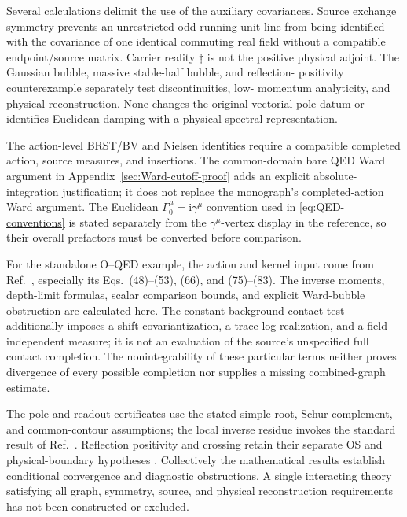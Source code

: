 \documentclass[final,5p,times,twocolumn,numbers,nopreprintline]{elsarticle}
\numberwithin{equation}{section}
\theoremstyle{definition}
\theoremstyle{remark}
\newcommand{\ii}{\mathrm i}
\begin{document}
Several calculations delimit the use of the auxiliary covariances.
Source exchange symmetry prevents an unrestricted odd running-unit
line from being identified with the covariance of one identical
commuting real field without a compatible endpoint/source matrix.
Carrier reality $\ddagger$ is not the positive physical adjoint.
The Gaussian bubble, massive stable-half bubble, and reflection-
positivity counterexample separately test discontinuities, low-
momentum analyticity, and physical reconstruction. None changes
the original vectorial pole datum or identifies Euclidean damping
with a physical spectral representation.

The action-level BRST/BV and Nielsen identities require a compatible
completed action, source measures, and insertions. The common-domain
bare QED Ward argument in Appendix~\ref{sec:Ward-cutoff-proof}
adds an explicit absolute-integration justification; it does not
replace the monograph's completed-action Ward argument.
The Euclidean $\Gamma_0^\mu=\ii\gamma^\mu$ convention used in
\eqref{eq:QED-conventions} is stated separately from the
$\gamma^\mu$-vertex display in the reference, so their overall
prefactors must be converted before comparison.

For the standalone O--QED example, the action and kernel input come
from Ref.~\cite{ChiapponeIgnition}, especially its
Eqs.~(48)--(53), (66), and (75)--(83).
The inverse moments, depth-limit formulas, scalar comparison bounds,
and explicit Ward-bubble obstruction are calculated here. The
constant-background contact test additionally imposes a shift
covariantization, a trace-log realization, and a field-independent
measure; it is not an evaluation of the source's unspecified full
contact completion. The nonintegrability of these particular
terms neither proves divergence of every possible completion nor
supplies a missing combined-graph estimate.

The pole and readout certificates use the stated simple-root,
Schur-complement, and common-contour assumptions; the local inverse
residue invokes the standard result of Ref.~\cite{Beyn2012}.
Reflection positivity and crossing retain their separate OS and
physical-boundary hypotheses \cite{OS1975,BrosEpsteinGlaser1965}.
Collectively the mathematical results establish conditional
convergence and diagnostic obstructions. A single interacting
theory satisfying all graph, symmetry, source, and physical
reconstruction requirements has not been constructed or excluded.
\end{document}
